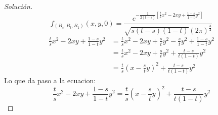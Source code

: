 \documentclass[11pt,notitlepage]{article}
\newenvironment{solucion}
  {\begin{proof}[Solución]}
  {\end{proof}}
\begin{document}
\begin{solucion}
\begin{equation}\label{3.5}
    f_{(B_s,B_t,B_1)}(x,y,0) = \frac{e^{-\frac{1}{2(t-s)}\left[\frac{t}{s}x^2 - 2xy   + \frac{1-s}{1-t}y^2 \right]}}{\sqrt{s(t-s)(1-t)}(2\pi)^{\frac{3}{2}}}
\end{equation}
\begin{align*}
     \frac{t}{s}x^2 - 2xy   + \frac{1-s}{1-t}y^2 &= \frac{t}{s}x^2 - 2xy  + \frac{s}{t}y^2 - \frac{s}{t}y^2 + \frac{1-s}{1-t}y^2\\
                                                 &= \frac{t}{s}x^2 - 2xy  + \frac{s}{t}y^2 +  \frac{t-s}{t(1-t)}y^2\\
                                                 &= \frac{t}{s}\left(x -  \frac{s}{t}y\right)^2 + \frac{t-s}{t(1-t)}y^2
\end{align*}
Lo que da paso a la ecuacion:  
\begin{equation}\label{3.6}
     \frac{t}{s}x^2 - 2xy   + \frac{1-s}{1-t}y^2 =\frac{t}{s}\left(x -  \frac{s}{t}y\right)^2 + \frac{t-s}{t(1-t)}y^2
\end{equation}


\end{solucion}
\end{document}
